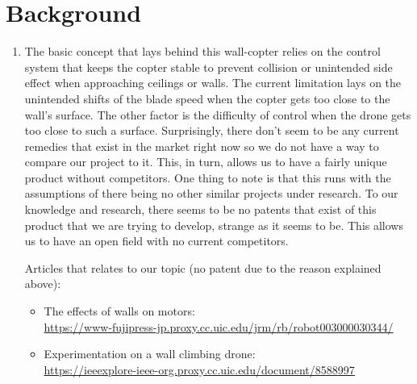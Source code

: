 \documentclass{article}
\begin{document}
    \section{Background}
        \begin{enumerate}[label=\Alph*.]
            \item The basic concept that lays behind this wall-copter relies on the control system that keeps the copter stable to prevent collision or unintended side effect when approaching ceilings or walls. The current limitation lays on the unintended shifts of the blade speed when the copter gets too close to the wall's surface. The other factor is the difficulty of control when the drone gets too close to such a surface. Surprisingly, there don't seem to be any current remedies that exist in the market right now so we do not have a way to compare our project to it. This, in turn, allows us to have a fairly unique product without competitors. One thing to note is that this runs with the assumptions of there being no other similar projects under research. To our knowledge and research, there seems to be no patents that exist of this product that we are trying to develop, strange as it seems to be. This allows us to have an open field with no current competitors.
            
            Articles that relates to our topic (no patent due to the reason explained above): 
            \begin{itemize}[label=]
                \item The effects of walls on motors:\\\url{https://www-fujipress-jp.proxy.cc.uic.edu/jrm/rb/robot003000030344/}
                \item Experimentation on a wall climbing drone:\\\url{https://ieeexplore-ieee-org.proxy.cc.uic.edu/document/8588997}
            \end{itemize}


\end{enumerate}
\end{document}
